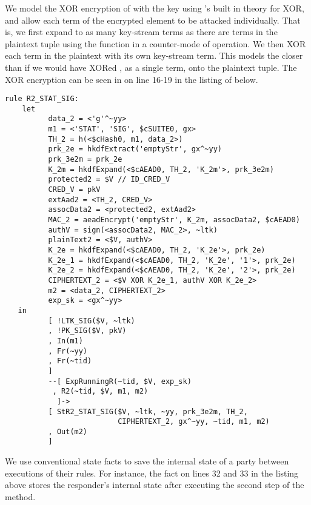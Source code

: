 %
We model the XOR encryption of  with the key  using
\mTamarin{}'s built in theory for XOR, and allow each term of the encrypted
element to be attacked individually.
%
That is, we first expand  to as many key-stream terms as there are
terms in the plaintext tuple using the \mHkdfExpand{} function in a counter-mode
of operation.
%
We then XOR each term in the plaintext with its own key-stream term.
%
This models the \mSpec{} closer than if we would have XORed , as a
single term, onto the plaintext tuple.
%
The XOR encryption can be seen in on line 16-19 in the listing of
 below.
%
\begin{lstlisting}
rule R2_STAT_SIG:
    let
          data_2 = <'g'^~yy>
          m1 = <'STAT', 'SIG', $cSUITE0, gx>
          TH_2 = h(<$cHash0, m1, data_2>)
          prk_2e = hkdfExtract('emptyStr', gx^~yy)
          prk_3e2m = prk_2e
          K_2m = hkdfExpand(<$cAEAD0, TH_2, 'K_2m'>, prk_3e2m)
          protected2 = $V // ID_CRED_V
          CRED_V = pkV
          extAad2 = <TH_2, CRED_V>
          assocData2 = <protected2, extAad2>
          MAC_2 = aeadEncrypt('emptyStr', K_2m, assocData2, $cAEAD0)
          authV = sign(<assocData2, MAC_2>, ~ltk)
          plainText2 = <$V, authV>
          K_2e = hkdfExpand(<$cAEAD0, TH_2, 'K_2e'>, prk_2e)
          K_2e_1 = hkdfExpand(<$cAEAD0, TH_2, 'K_2e', '1'>, prk_2e)
          K_2e_2 = hkdfExpand(<$cAEAD0, TH_2, 'K_2e', '2'>, prk_2e)
          CIPHERTEXT_2 = <$V XOR K_2e_1, authV XOR K_2e_2>
          m2 = <data_2, CIPHERTEXT_2>
          exp_sk = <gx^~yy>
   in
          [ !LTK_SIG($V, ~ltk)
          , !PK_SIG($V, pkV)
          , In(m1)
          , Fr(~yy)
          , Fr(~tid)
          ]
          --[ ExpRunningR(~tid, $V, exp_sk)
           , R2(~tid, $V, m1, m2)
            ]->
          [ StR2_STAT_SIG($V, ~ltk, ~yy, prk_3e2m, TH_2,
                          CIPHERTEXT_2, gx^~yy, ~tid, m1, m2)
          , Out(m2)
          ]
\end{lstlisting}

We use conventional state facts to save the internal state of a party between
executions of their rules.
%
For instance, the fact
 on lines 32 and 33
in the listing above stores the responder's internal state after executing the
second step of the \mStatSig{} method.
%

